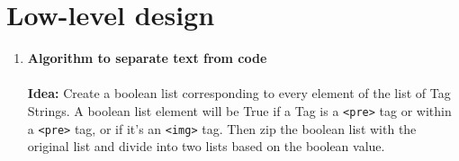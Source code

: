 \documentclass{scrreprt}
\begin{document}
\section{Low-level design}


\begin{enumerate}
    \item \textbf{Algorithm to separate text from code} \\ 
    \\ \textbf{Idea:} Create a boolean list corresponding to every element of the list of Tag Strings. A boolean list element will be True if a Tag is a \texttt{<pre>} tag or within a \texttt{<pre>} tag, or if it's an \texttt{<img>} tag. Then zip the boolean list with the original list and divide into two lists based on the boolean value.\\












\end{enumerate}
\end{document}
